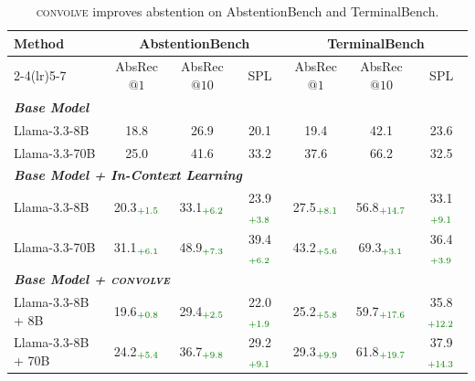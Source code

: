 \documentclass{article}
\newcommand{\method}{\textsc{convolve}\xspace}
\begin{document}
\begin{table}[!t]
\vspace{0.8em}
\centering
\footnotesize
\caption{\method improves abstention on AbstentionBench and TerminalBench.}
\vspace{-0.5em}
\label{tab:additional_context_evolving}
\setlength\tabcolsep{3.0pt}
\fontsize{7.8pt}{9.2pt}\selectfont
\begin{tabular}{p{2.55cm}ccc ccc}
\toprule
\multirow{2}{*}{\textbf{Method}}
& \multicolumn{3}{c}{\textbf{AbstentionBench}}
& \multicolumn{3}{c}{\textbf{TerminalBench}} \\
\cmidrule(lr){2-4}\cmidrule(lr){5-7}
& AbsRec$@1$ & AbsRec$@10$ & SPL
& AbsRec$@1$ & AbsRec$@10$ & SPL \\
\midrule

\multicolumn{7}{l}{\textit{\textbf{Base Model}}} \\
Llama-3.3-8B
& 18.8 & 26.9 & 20.1
& 19.4 & 42.1 & 23.6 \\
Llama-3.3-70B
& 25.0 & 41.6 & 33.2
& 37.6 & 66.2 & 32.5 \\

\midrule
\multicolumn{7}{l}{\textit{\textbf{Base Model + In-Context Learning}}} \\
Llama-3.3-8B
& 20.3$_{\text{\textcolor{scoregreen}{+1.5}}}$  
& 33.1$_{\text{\textcolor{scoregreen}{+6.2}}}$
& 23.9$_{\text{\textcolor{scoregreen}{+3.8}}}$
& 27.5$_{\text{\textcolor{scoregreen}{+8.1}}}$ 
& 56.8$_{\text{\textcolor{scoregreen}{+14.7}}}$ 
& 33.1$_{\text{\textcolor{scoregreen}{+9.1}}}$  \\
Llama-3.3-70B
& 31.1$_{\text{\textcolor{scoregreen}{+6.1}}}$  
& 48.9$_{\text{\textcolor{scoregreen}{+7.3}}}$
& 39.4$_{\text{\textcolor{scoregreen}{+6.2}}}$
& 43.2$_{\text{\textcolor{scoregreen}{+5.6}}}$ 
& 69.3$_{\text{\textcolor{scoregreen}{+3.1}}}$ 
& 36.4$_{\text{\textcolor{scoregreen}{+3.9}}}$  \\

\midrule
\multicolumn{7}{l}{\textit{\textbf{Base Model + \method}}} \\
Llama-3.3-8B + 8B
& 19.6$_{\text{\textcolor{scoregreen}{+0.8}}}$ 
& 29.4$_{\text{\textcolor{scoregreen}{+2.5}}}$ 
& 22.0$_{\text{\textcolor{scoregreen}{+1.9}}}$ 
& 25.2$_{\text{\textcolor{scoregreen}{+5.8}}}$ 
& 59.7$_{\text{\textcolor{scoregreen}{+17.6}}}$ 
& 35.8$_{\text{\textcolor{scoregreen}{+12.2}}}$  \\
Llama-3.3-8B + 70B
& 24.2$_{\text{\textcolor{scoregreen}{+5.4}}}$  
& 36.7$_{\text{\textcolor{scoregreen}{+9.8}}}$ 
& 29.2$_{\text{\textcolor{scoregreen}{+9.1}}}$ 
& 29.3$_{\text{\textcolor{scoregreen}{+9.9}}}$ 
& 61.8$_{\text{\textcolor{scoregreen}{+19.7}}}$ 
& 37.9$_{\text{\textcolor{scoregreen}{+14.3}}}$ \\


\end{tabular}
\end{table}
\end{document}
